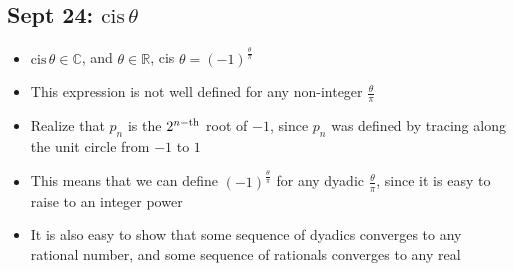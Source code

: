 \documentclass[10pt, oneside]{article}
\newcommand{\R}{\mathbb{R}}
\newcommand{\C}{\mathbb{C}}
\newcommand{\cis}{\text{cis} \,}
\begin{document}
\subsection{Sept 24: $\cis \theta$}
\begin{itemize}
    \item $\cis \theta \in \C$, and $\theta \in \R$, cis $\theta = (-1)^{\frac{\theta}{\pi}}$
    \item This expression is not well defined for any non-integer $\frac{\theta}{\pi}$
    \item Realize that $p_n$ is the $2^{n \rm{-th}}$ root of $-1$, since $p_n$ was defined by tracing along the unit circle from $-1$ to $1$
    \item This means that we can define $(-1)^{\frac{\theta}{\pi}}$ for any dyadic $\frac{\theta}{\pi}$, since it is easy to raise to an integer power
    \item It is also easy to show that some sequence of dyadics converges to any rational number, and some sequence of rationals converges to any real
\end{itemize}
\end{document}
